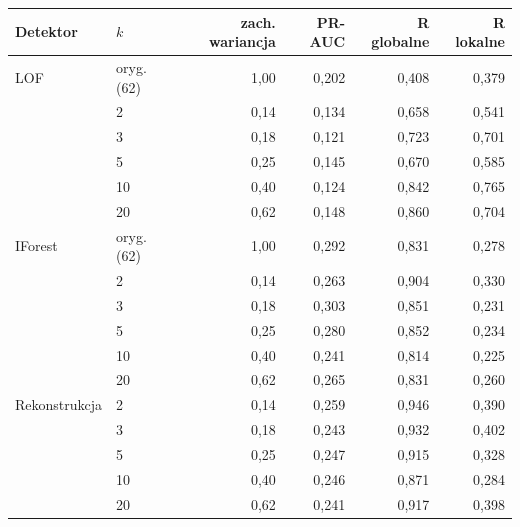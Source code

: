 \begin{tabular}{llrrrr}
\toprule
Detektor & $k$ & zach. wariancja & PR-AUC & R globalne & R lokalne \\
\midrule
LOF & oryg. (62) & 1,00 & 0,202 & 0,408 & 0,379 \\
 & 2 & 0,14 & 0,134 & 0,658 & 0,541 \\
 & 3 & 0,18 & 0,121 & 0,723 & 0,701 \\
 & 5 & 0,25 & 0,145 & 0,670 & 0,585 \\
 & 10 & 0,40 & 0,124 & 0,842 & 0,765 \\
 & 20 & 0,62 & 0,148 & 0,860 & 0,704 \\
IForest & oryg. (62) & 1,00 & 0,292 & 0,831 & 0,278 \\
 & 2 & 0,14 & 0,263 & 0,904 & 0,330 \\
 & 3 & 0,18 & 0,303 & 0,851 & 0,231 \\
 & 5 & 0,25 & 0,280 & 0,852 & 0,234 \\
 & 10 & 0,40 & 0,241 & 0,814 & 0,225 \\
 & 20 & 0,62 & 0,265 & 0,831 & 0,260 \\
Rekonstrukcja & 2 & 0,14 & 0,259 & 0,946 & 0,390 \\
 & 3 & 0,18 & 0,243 & 0,932 & 0,402 \\
 & 5 & 0,25 & 0,247 & 0,915 & 0,328 \\
 & 10 & 0,40 & 0,246 & 0,871 & 0,284 \\
 & 20 & 0,62 & 0,241 & 0,917 & 0,398 \\
\bottomrule
\end{tabular}
